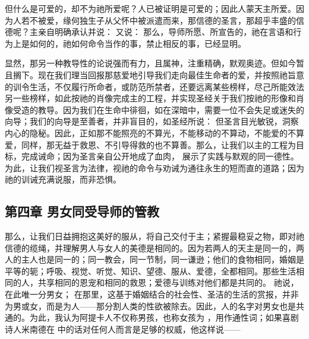 但什么是可爱的，却不为祂所爱呢？人已被证明是可爱的；因此人蒙天主所爱。因为人若不被爱，缘何独生子从父怀中被派遣而来，那信德的圣言，那超乎丰盛的信德呢？主亲自明确承认并说： 又说： 那么，导师所愿、所宣告的，祂在言语和行为上是如何的，祂如何命令当作的事，禁止相反的事，已经显明。\par

显然，那另一种教导性的论说强而有力，且属神，注重精确，默观奥迹。但如今暂且搁下。现在我们理当回报那慈爱地引导我们走向最佳生命者的爱，并按照祂旨意的训令生活，不仅履行所命者，或防范所禁者，还要远离某些榜样，尽己所能效法另一些榜样，如此按祂的肖像完成主的工程，并实现圣经关于我们按祂的形像和肖像受造的教导。因为我们在生命中徘徊，如在深暗中，需要一位不会失足或迷失的向导；我们的向导是至善者，并非盲目的，如圣经所说：  但圣言目光敏锐，洞察内心的隐秘。因此，正如那不能照亮的不算光，不能移动的不算动，不能爱的不算爱，同样，那无益于救恩、不引导得救的也不算善。那么，让我们以主的工程为目标，完成诫命；因为圣言亲自公开地成了血肉， 展示了实践与默观的同一德性。为此，让我们视圣言为法律，视祂的命令与劝诫为通往永生的短而直的道路；因为祂的训诫充满说服，而非恐惧。\par


\subsection{第四章  男女同受导师的管教}

那么，让我们日益拥抱这美好的服从，将自己交付于主；紧握最稳妥之物，即对祂信德的缆绳，并理解男人与女人的美德是相同的。因为若两人的天主是同一的，两人的主人也是同一的；同一教会，同一节制，同一谦逊；他们的食物相同，婚姻是平等的轭；呼吸、视觉、听觉、知识、望德、服从、爱德，全都相同。那些生活相同的人，共享相同的恩宠和相同的救恩；爱德与训练对他们都是共同的。 祂说，  在此唯一分男女； 在那里，这基于婚姻结合的社会性、圣洁的生活的赏报，并非为男或女，而是为人——那分割人类的性欲被除去。因此，人的名字对男女也是共通的。为此，我认为阿提卡人不仅称男孩，也称女孩为 ，用作通性词；如果喜剧诗人米南德在  中的话对任何人而言是足够的权威，他这样说——\par

